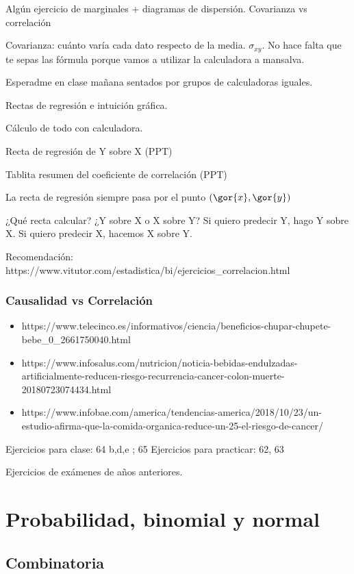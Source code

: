 Algún ejercicio de marginales + diagramas de dispersión. Covarianza vs correlación

Covarianza: cuánto varía cada dato respecto de la media. $\sigma_{xy}$. No hace falta que te sepas las fórmula porque vamos a utilizar la calculadora a mansalva. 

Esperadme en clase mañana sentados por grupos de calculadoras iguales.

Rectas de regresión e intuición gráfica.

Cálculo de todo con calculadora.

Recta de regresión de Y sobre X (PPT)

Tablita resumen del coeficiente de correlación (PPT)

La recta de regresión siempre pasa por el punto $(\gor{x},\gor{y})$

¿Qué recta calcular? ¿Y sobre X o X sobre Y? Si quiero predecir Y, hago Y sobre X. Si quiero predecir X, hacemos X sobre Y.

Recomendación: https://www.vitutor.com/estadistica/bi/ejercicios\_correlacion.html

\subsubsection{Causalidad vs Correlación}

\begin{itemize}
	\item https://www.telecinco.es/informativos/ciencia/beneficios-chupar-chupete-bebe_0_2661750040.html
	\item https://www.infosalus.com/nutricion/noticia-bebidas-endulzadas-artificialmente-reducen-riesgo-recurrencia-cancer-colon-muerte-20180723074434.html
	\item https://www.infobae.com/america/tendencias-america/2018/10/23/un-estudio-afirma-que-la-comida-organica-reduce-un-25-el-riesgo-de-cancer/
\end{itemize}

Ejercicios para clase: 64 b,d,e ; 65
Ejercicios para practicar: 62, 63

Ejercicios de exámenes de años anteriores.

\section{Probabilidad, binomial y normal}

\subsection{Combinatoria}

